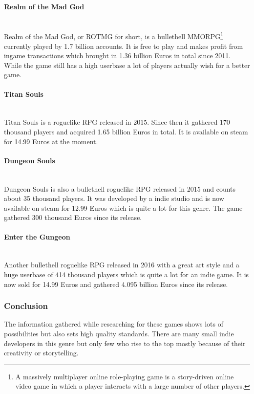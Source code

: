 \documentclass[11pt]{article}
\begin{document}
\paragraph{Realm of the Mad God}~\\
Realm of the Mad God, or ROTMG for short, is a bullethell MMORPG\footnote{A massively multiplayer online role-playing game is a story-driven online video game in which a player interacts with a large number of other players.} currently played by 1.7 billion accounts.
It is free to play and makes profit from ingame transactions which brought in 1.36 billion Euros in total since 2011.\\
While the game still has a high userbase a lot of players actually wish for a better game.

\paragraph{Titan Souls}~\\
Titan Souls is a roguelike RPG released in 2015. Since then it gathered 170 thousand players and acquired 1.65 billion Euros in total. It is available on steam for 14.99 Euros at the moment.

\paragraph{Dungeon Souls}~\\
Dungeon Souls is also a bullethell roguelike RPG released in 2015 and counts about 35 thousand players. It was developed by a indie studio and is now available on steam for 12.99 Euros which is quite a lot for this genre. 
The game gathered 300 thousand Euros since its release.

\paragraph{Enter the Gungeon}~\\
Another bullethell roguelike RPG released in 2016 with a great art style and a huge userbase of 414 thousand players which is quite a lot for an indie game. 
It is now sold for 14.99 Euros and gathered 4.095 billion Euros since its release.

\subsubsection{Conclusion}
The information gathered while researching for these games shows lots of possibilities but also sets high quality standards. 
There are many small indie developers in this genre but only few who rise to the top mostly because of their creativity or storytelling.
\end{document}
